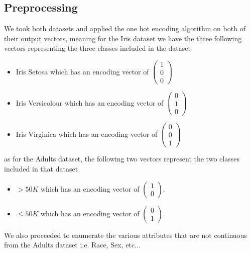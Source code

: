\documentclass[11pt]{article}
\theoremstyle{definition}
\begin{document}
\subsection{Preprocessing}
We took both datasets and applied the one hot encoding algorithm on both of their output vectors, meaning for the Iris dataset we have the three following vectors representing the three classes included in the dataset
\begin{itemize}
\item Iris Setosa which has an encoding vector of $\begin{pmatrix}1\\0\\0\end{pmatrix}$
\item Iris Versicolour which has an encoding vector of $\begin{pmatrix}0\\1\\0\end{pmatrix}$
\item Iris Virginica which has an encoding vector of $\begin{pmatrix}0\\0\\1\end{pmatrix}$
\end{itemize}
as for the Adults dataset, the following two vectors represent the two classes included in that dataset
\begin{itemize}
\item $>50K$ which has an encoding vector of $\begin{pmatrix}1\\0\end{pmatrix}$.
\item $\leq 50K$ which has an encoding vector of $\begin{pmatrix}0\\1\end{pmatrix}$.
\end{itemize}
We also proceeded to enumerate the various attributes that are not continuous from the Adults dataset i.e. Race, Sex, etc...
\end{document}
